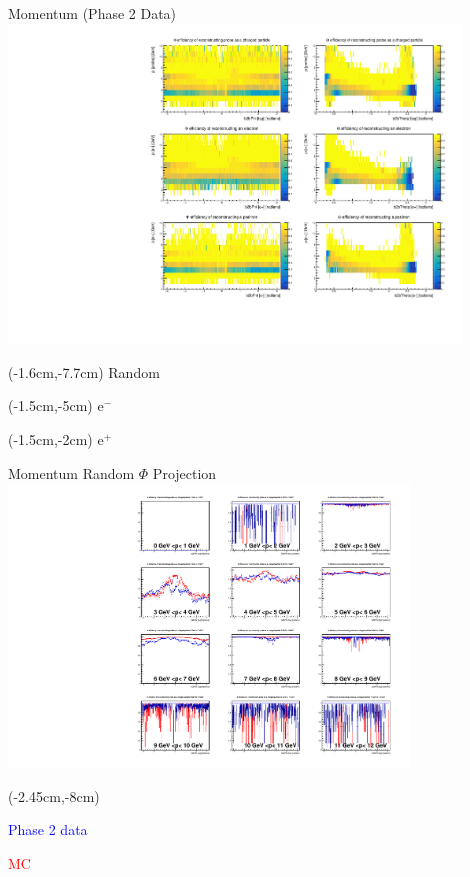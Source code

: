 \documentclass[10pt]{beamer}
\begin{document}
\begin{frame}{Momentum (Phase 2 Data)}
	\centering
	\includegraphics[width=0.9\textwidth]{Momentum/M_Data.pdf}
\begin{textblock*}{0.3\textwidth}(-1.6cm,-7.7cm)
	Random
\end{textblock*}

\begin{textblock*}{0.3\textwidth}(-1.5cm,-5cm)
	$\textrm{e}^-$
\end{textblock*}
\begin{textblock*}{0.3\textwidth}(-1.5cm,-2cm)
	$\textrm{e}^+$
\end{textblock*}	
	
	

\end{frame}










\begin{frame}{Momentum Random $\Phi$ Projection}
	\centering
	\includegraphics[width=0.8\textwidth]{Momentum/PMPhiRandom.pdf}


\begin{textblock*}{0.5\textwidth}(-2.45cm,-8cm)
	\small{
	\textcolor{blue}{Phase 2 data}
	
	\textcolor{red}{MC}
}
	
\end{textblock*}


\end{frame}
\end{document}
